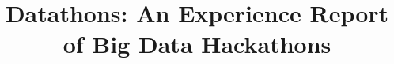 \documentclass{sig-alternate-2013}
\begin{document}
%


\title{Datathons: An Experience Report of Big Data Hackathons}

%
%
%
%
%
\end{document}
